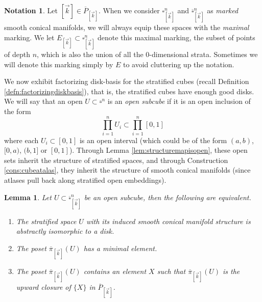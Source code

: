 \documentclass[10pt, reqno, twoside
, final
]{amsart}
\numberwithin{equation}{subsection}%
\theoremstyle{definition}
\theoremstyle{definition}
\theoremstyle{definition}
\newtheorem{nota}[defn]{Notation}
\theoremstyle{definition}
\theoremstyle{definition}
\theoremstyle{definition}
\theoremstyle{definition}
\theoremstyle{definition}
\theoremstyle{definition}
\theoremstyle{plain}
\theoremstyle{definition}
\theoremstyle{plain}
\theoremstyle{definition}
\theoremstyle{plain}
\theoremstyle{definition}
\theoremstyle{definition}
\theoremstyle{plain}
\newtheorem{lem}[defn]{Lemma}
\theoremstyle{plain}
\theoremstyle{definition}
\theoremstyle{plain}
\theoremstyle{plain}
\theoremstyle{plain}
\begin{document}
\begin{nota}
Let $[\vec{k}]\in \overline{P}_{[\vec{k}]}$. When we consider $\square_{[\vec{k}]}^n$ and $\overline{\square}_{[\vec{k}]}^n$ as \emph{marked} smooth conical manifolds, we will always equip these spaces with the \emph{maximal} marking. We let $E_{[\vec{k}]}\subset \square^n_{[\vec{k}]}$ denote this maximal marking, the subset of points of depth $n$, which is also the union of all the 0-dimensional strata. Sometimes we will denote this marking simply by $E$ to avoid cluttering up the notation.   
\end{nota}

We now exhibit factorizing disk-basis for the stratified cubes (recall Definition \ref{defn:factorizingdiskbasis}), that is, the stratified cubes have enough good disks. We will say that an open $U\subset \overline{\square}^n$ is an \emph{open subcube} if it is an open inclusion of the form 
\[ \prod_{i=1}^n U_i\subset \prod_{i=1}^n [0,1] \]
where each $U_i\subset [0,1]$ is an open interval (which could be of the form $(a,b)$, $[0,a)$, $(b,1]$ or $[0,1]$). Through Lemma \ref{lem:structuremapisopen}, these open sets inherit the structure of stratified spaces, and through Construction \ref{cons:cubeatalas}, they inherit the structure of smooth conical manifolds (since atlases pull back along stratified open embeddings).
\begin{lem}\label{lem:disklikecubes}
Let $U\subset \overline{\square}^n_{[\vec{k}]}$ be an open subcube, then the following are equivalent.
\begin{enumerate}[$(1)$]
    \item The stratified space $U$ with its induced smooth conical manifold structure is abstractly isomorphic to a disk.
    \item The poset $\overline{\pi}_{[\vec{k}]}(U)$ has a minimal element.
    \item The poset $\overline{\pi}_{[\vec{k}]}(U)$ contains an element $X$ such that $\overline{\pi}_{[\vec{k}]}(U)$ is the upward closure of $\{X\}$ in $\overline{P}_{[\vec{k}]}$.
\end{enumerate}
\end{lem}
\end{document}
